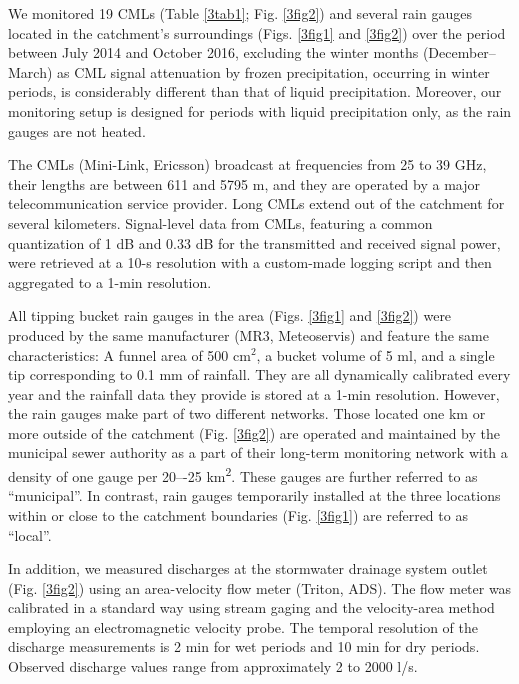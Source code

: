 \documentclass{ctuthesis}\usepackage[]{graphicx}\usepackage[]{color}
\begin{document}
We monitored 19 CMLs (Table \ref{3tab1}; Fig. \ref{3fig2}) and several rain gauges located in the catchment's surroundings (Figs. \ref{3fig1} and \ref{3fig2}) over the period between July 2014 and October 2016, excluding the winter months (December--March) as CML signal attenuation by frozen precipitation, occurring in winter periods, is considerably different than that of liquid precipitation. Moreover, our monitoring setup is designed for periods with liquid precipitation only, as the rain gauges are not heated.

The CMLs (Mini-Link, Ericsson) broadcast at frequencies from 25 to 39 GHz, their lengths are between 611 and 5795 m, and they are operated by a major telecommunication service provider. Long CMLs extend out of the catchment for several kilometers. Signal-level data from CMLs, featuring a common quantization of 1 dB and 0.33 dB for the transmitted and received signal power, were retrieved at a 10-s resolution with a custom-made logging script \citep{fenclCommercialMicrowaveLinks2015} and then aggregated to a 1-min resolution.

All tipping bucket rain gauges in the area (Figs. \ref{3fig1} and \ref{3fig2}) were produced by the same manufacturer (MR3, Meteoservis)  and feature the same characteristics:  A funnel area of 500 cm$^2$, a bucket volume of 5 ml, and a single tip corresponding to 0.1 mm of rainfall. They are all dynamically calibrated \citep{humphreyNewMethodAutomated1997} every year and the rainfall data they provide is stored at a 1-min resolution. However, the rain gauges make part of two different networks. Those located one km or more outside of the catchment (Fig. \ref{3fig2}) are operated and maintained by the municipal sewer authority as a part of their long-term monitoring network with a density of one gauge per 20–-25 km\textsuperscript{2}. These gauges are further referred to as \enquote{municipal}. In contrast, rain gauges temporarily installed at the three locations within or close to the catchment boundaries (Fig. \ref{3fig1}) are referred to as \enquote{local}. 

In addition, we measured discharges at the stormwater drainage system outlet (Fig. \ref{3fig2}) using an area-velocity flow meter (Triton, ADS). The flow meter was calibrated in a standard way using stream gaging and the velocity-area method employing an electromagnetic velocity probe. The temporal resolution of the discharge measurements is 2 min for wet periods and 10 min for dry periods. Observed discharge values range from approximately 2 to 2000 l/s.
\end{document}
